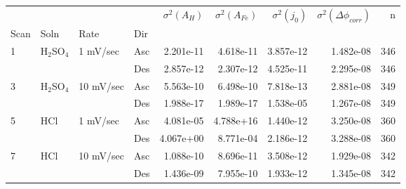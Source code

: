 \begin{tabular}{llllrrrrr}
\toprule
  &     &           &     &  $\sigma^2(A_H)$ &  $\sigma^2(A_{Fe})$ &  $\sigma^2(j_0)$ &  $\sigma^2(\Delta \phi_{corr})$ &    n \\
Scan & Soln & Rate & Dir &                  &                     &                  &                                 &      \\
\midrule
1 & H$_2$SO$_4$ & 1 mV/sec & Asc &        2.201e-11 &           4.618e-11 &        3.857e-12 &                       1.482e-08 &  346 \\
  &     &           & Des &        2.857e-12 &           2.307e-12 &        4.525e-11 &                       2.295e-08 &  346 \\
3 & H$_2$SO$_4$ & 10 mV/sec & Asc &        5.563e-10 &           6.498e-10 &        7.818e-13 &                       2.881e-08 &  349 \\
  &     &           & Des &        1.988e-17 &           1.989e-17 &        1.538e-05 &                       1.267e-08 &  349 \\
5 & HCl & 1 mV/sec & Asc &        4.081e-05 &           4.788e+16 &        1.440e-12 &                       3.250e-08 &  360 \\
  &     &           & Des &        4.067e+00 &           8.771e-04 &        2.186e-12 &                       3.288e-08 &  360 \\
7 & HCl & 10 mV/sec & Asc &        1.088e-10 &           8.696e-11 &        3.508e-12 &                       1.929e-08 &  342 \\
  &     &           & Des &        1.436e-09 &           7.955e-10 &        1.933e-12 &                       1.345e-08 &  342 \\
\bottomrule
\end{tabular}
